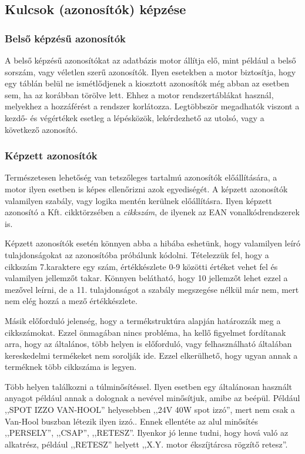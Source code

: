 \documentclass[a4paper,12pt]{report}
\begin{document}
\subsection{Kulcsok (azonosítók) képzése}

\subsubsection{Belső képzésű azonosítók}
A belső képzésű azonosítókat az adatbázis motor állítja elő, mint például a 
belső sorszám, vagy véletlen szerű azonosítók. Ilyen esetekben a motor 
biztosítja, hogy egy táblán belül ne ismétlődjenek a kiosztott azonosítók még 
abban az esetben sem, ha az korábban törölve lett. Ehhez a motor 
rendszertáblákat használ, melyekhez a hozzáférést a rendszer korlátozza. 
Legtöbbször megadhatók viszont a kezdő- és végértékek esetleg a lépésközök, 
lekérdezhető az utolsó, vagy a következő azonosító.

\subsubsection{Képzett azonosítók}
Természetesen lehetőség van tetszőleges tartalmú azonosítók előállítására, a 
motor ilyen esetben is képes ellenőrizni azok egyediségét. A képzett azonosítók 
valamilyen szabály, vagy logika mentén kerülnek előállításra. Ilyen képzett 
azonosító a Kft. cikktörzsében a \textit{cikkszám}, de ilyenek az EAN 
vonalkódrendszerek is.

Képzett azonosítók esetén könnyen abba a hibába eshetünk, hogy valamilyen leíró
tulajdonságokat az azonosítóba próbálunk kódolni.
Tételezzük fel, hogy a cikkszám 7.karaktere egy szám, értékkészlete 0-9 közötti értéket vehet fel és valamilyen jellemzőt takar. Könnyen belátható, hogy 10 jellemzőt lehet ezzel a mezővel leírni, de a 11. tulajdonságot a szabály megszegése nélkül már nem, mert nem elég hozzá a mező értékkészlete.

Másik előforduló jelenség, hogy a termékstruktúra alapján határozzák meg a 
cikkszámokat. Ezzel önmagában nincs probléma, ha kellő figyelmet fordítanak 
arra, hogy az általános, több helyen is előforduló, vagy felhasználható 
általában kereskedelmi termékeket nem sorolják ide. Ezzel elkerülhető, 
hogy ugyan annak a terméknek több cikkszáma is legyen.

Több helyen találkozni a túlminősítéssel. Ilyen esetben egy általánosan használt anyagot például annak a dolognak a nevével minősítjuk, amibe az beépül. Például ,,SPOT IZZO VAN-HOOL'' helyesebben ,,24V 40W spot izzó'', mert nem csak a Van-Hool buszban létezik ilyen izzó.. Ennek ellentéte az alul minősítés ,,PERSELY'', ,,CSAP'', ,,RETESZ''. Ilyenkor jó lenne tudni, hogy hová való az alkatrész, például ,,RETESZ'' helyett ,,X.Y. motor ékszíjtárcsa rögzítő retesz''.
\end{document}
